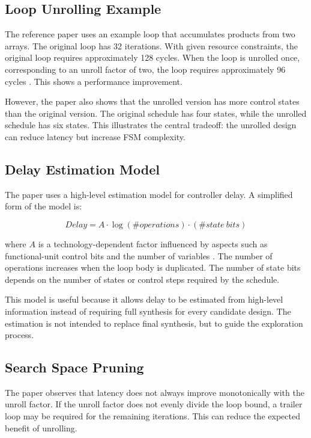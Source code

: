 \documentclass[conference]{IEEEtran}
\begin{document}
\subsection{Loop Unrolling Example}

The reference paper uses an example loop that accumulates products from two arrays. The original loop has 32 iterations. With given resource constraints, the original loop requires approximately 128 cycles. When the loop is unrolled once, corresponding to an unroll factor of two, the loop requires approximately 96 cycles \cite{kurra2007}. This shows a performance improvement.

However, the paper also shows that the unrolled version has more control states than the original version. The original schedule has four states, while the unrolled schedule has six states. This illustrates the central tradeoff: the unrolled design can reduce latency but increase FSM complexity.

\subsection{Delay Estimation Model}

The paper uses a high-level estimation model for controller delay. A simplified form of the model is:

\begin{equation}
Delay = A \cdot \log(\#operations) \cdot (\#state\ bits)
\end{equation}

where $A$ is a technology-dependent factor influenced by aspects such as functional-unit control bits and the number of variables \cite{kurra2007}. The number of operations increases when the loop body is duplicated. The number of state bits depends on the number of states or control steps required by the schedule.

This model is useful because it allows delay to be estimated from high-level information instead of requiring full synthesis for every candidate design. The estimation is not intended to replace final synthesis, but to guide the exploration process.

\subsection{Search Space Pruning}

The paper observes that latency does not always improve monotonically with the unroll factor. If the unroll factor does not evenly divide the loop bound, a trailer loop may be required for the remaining iterations. This can reduce the expected benefit of unrolling.
\end{document}
